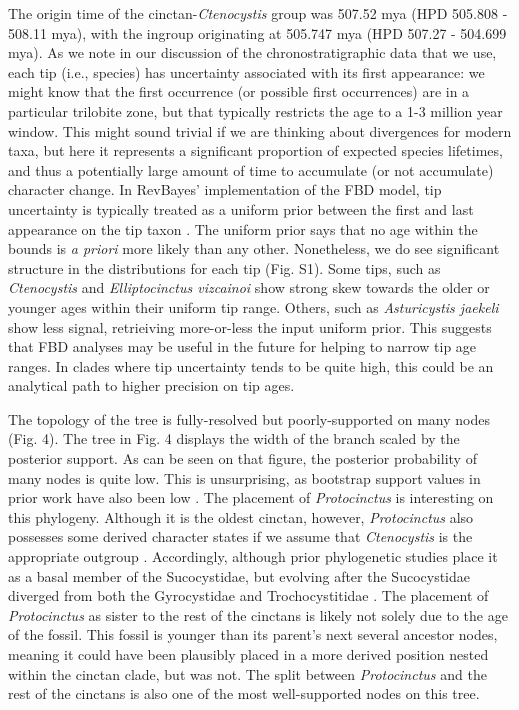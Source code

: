 \documentclass{article}
\begin{document}
The origin time of the cinctan-\textit{Ctenocystis} group was 507.52 mya (HPD 505.808 - 508.11 mya), with the ingroup originating at 505.747 mya (HPD 507.27 - 504.699 mya).
As we note in our discussion of the chronostratigraphic data that we use, each tip (i.e., species) has uncertainty associated with its first appearance: we might know that the first occurrence (or possible first occurrences) are in a particular trilobite zone, but that typically restricts the age to a 1-3 million year window.  This might sound trivial if we are thinking about divergences for modern taxa, but here it represents a significant proportion of expected species lifetimes, and thus a potentially large amount of time to accumulate (or not accumulate) character change.
In RevBayes' implementation of the FBD model, tip uncertainty is typically treated as a uniform prior between the first and last appearance on the tip taxon \citep{baridosottani2020}.
The uniform prior says that no age within the bounds is \textit{a priori} more likely than any other.
Nonetheless, we do see significant structure in the distributions for each tip (Fig. S1). 
Some tips, such as \textit{Ctenocystis} and \textit{Elliptocinctus vizcainoi} show strong skew towards the older or younger ages within their uniform tip range.
Others, such as \textit{Asturicystis jaekeli} show less signal, retrieiving more-or-less the input uniform prior.
This suggests that FBD analyses may be useful in the future for helping to narrow tip age ranges.
In clades where tip uncertainty tends to be quite high, this could be an analytical path to higher precision on tip ages.

The topology of the tree is fully-resolved but poorly-supported on many nodes (Fig. 4).
The tree in Fig. 4 displays the width of the branch scaled by the posterior support.
As can be seen on that figure, the posterior probability of many nodes is quite low. 
This is unsurprising, as bootstrap support values in prior work have also been low \citep{SmithZamora2009, ZamoraEtAl2013}.
The placement of \textit{Protocinctus} is interesting on this phylogeny. 
Although it is the oldest cinctan, however, \textit{Protocinctus} also possesses some derived character states if we assume that \textit{Ctenocystis} is the appropriate outgroup \citep{Rahman2009a}.  Accordingly, although prior phylogenetic studies place it as a basal member of the Sucocystidae, but evolving after the Sucocystidae diverged from both the Gyrocystidae and Trochocystitidae \citep{SmithZamora2009, ZamoraRahmanSmith2013}. 
The placement of \textit{Protocinctus} as sister to the rest of the cinctans is likely not solely due to the age of the fossil. This fossil is younger than its parent's next several ancestor nodes, meaning it could have been plausibly placed in a more derived position nested within the cinctan clade, but was not. 
The split between \textit{Protocinctus} and the rest of the cinctans is also one of the most well-supported nodes on this tree.
\end{document}
